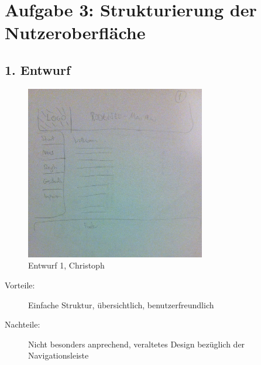 \documentclass{scrartcl}
\begin{document}
\section*{Aufgabe 3: Strukturierung der Nutzeroberfläche}

 \subsection*{1. Entwurf}
  \begin{figure}[H]
 \centering
\includegraphics[width=0.7\textwidth]{Version1.jpg}
\caption{Entwurf 1, Christoph}
\end{figure}
 \begin{description}
 \item[Vorteile:]
 Einfache Struktur, übersichtlich, benutzerfreundlich
 \item[Nachteile:] Nicht besonders anprechend, veraltetes Design bezüglich der Navigationsleiste
\end{description}
 
\end{document}
